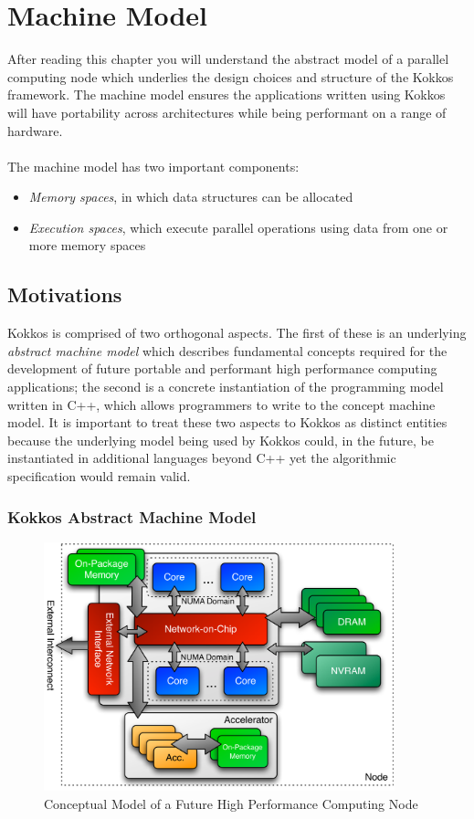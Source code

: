 \chapter{Machine Model}
\label{C:Model}

After reading this chapter you will understand the abstract model
of a parallel computing node which underlies the design choices
and structure of the Kokkos framework. The machine model ensures
the applications written using Kokkos will have portability across
architectures while being performant on a range of hardware.\\
\\
\noindent
The machine model has two important components:
\begin{itemize}
\item \emph{Memory spaces}, in which data structures can be allocated
\item \emph{Execution spaces}, which execute parallel operations using
  data from one or more memory spaces
\end{itemize}

\section{Motivations}\label{S:Model:Motivations}

Kokkos is comprised of two orthogonal aspects. The first of these is 
an underlying {\em abstract machine model} which describes fundamental
concepts required for the development of future portable and performant
high performance computing applications; the second is a concrete instantiation
of the programming model written in C++, which allows programmers
to write to the concept machine model. It is important to treat these
two aspects to Kokkos as distinct entities because the underlying model
being used by Kokkos could, in the future, be instantiated in additional
languages beyond C++ yet the algorithmic specification would remain
valid.

\subsection{Kokkos Abstract Machine Model}

\begin{figure}
\begin{center}
\includegraphics[width=4in]{figures/kokkos-node.pdf}
\caption{Conceptual Model of a Future High Performance Computing Node}
\label{fig:kokkosnode}
\end{center}
\end{figure}

